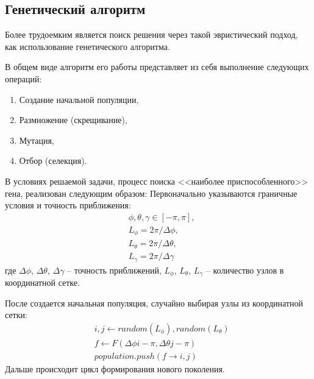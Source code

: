 \subsection{Генетический алгоритм}
\noindent\indent Более трудоемким является поиск решения через такой эвристический
подход, как использование генетического алгоритма.\par
  В общем виде алгоритм его работы представляет из себя выполнение следующих операций:
\begin{enumerate}
  \item Создание начальной популяции,
  \item Размножение (скрещивание),
  \item Мутация,
  \item Отбор (селекция).
\end{enumerate}\par
  В условиях решаемой задачи, процесс поиска <<наиболее приспособленного>> гена,
реализован следующим образом:
  Первоначально указываются граничные условия и точность приближения:
\begin{equation}
  \begin{aligned}
    &\phi, \theta, \gamma \in [-\pi, \pi], \\
    &L_{\phi} = 2\pi / \Delta \phi, \\
    &L_{\theta} = 2\pi / \Delta \theta, \\
    &L_{\gamma} = 2\pi / \Delta \gamma
  \end{aligned}
\end{equation}
где $\Delta\phi$, $\Delta\theta$, $\Delta \gamma$ -- точность приближений,
$L_{\phi}$, $L_{\theta}$, $L_{\gamma}$ -- количество узлов в координатной сетке.\par
  После создается начальная популяция, случайно выбирая узлы из координатной сетки:
\begin{equation}
  \begin{aligned}
    & i, j \leftarrow random(L_\phi), random(L_\theta) \\
    & f \leftarrow F(\Delta \phi i - \pi, \Delta \theta j - \pi) \\
    & population.push(f \rightarrow i, j)
  \end{aligned}
\end{equation}
  Дальше происходит цикл формирования нового поколения.
